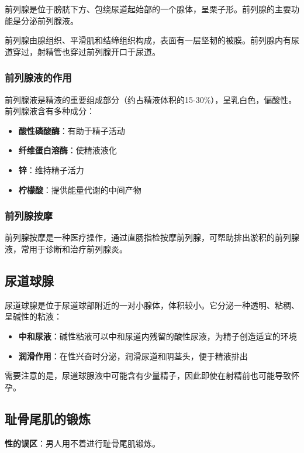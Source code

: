前列腺是位于膀胱下方、包绕尿道起始部的一个腺体，呈栗子形。前列腺的主要功能是分泌前列腺液。

前列腺由腺组织、平滑肌和结缔组织构成，表面有一层坚韧的被膜。前列腺内有尿道穿过，射精管也穿过前列腺开口于尿道。

\subsubsection{前列腺液的作用}

前列腺液是精液的重要组成部分（约占精液体积的15-30\%），呈乳白色，偏酸性。前列腺液含有多种成分：
\begin{itemize}
    \item \textbf{酸性磷酸酶}：有助于精子活动
    \item \textbf{纤维蛋白溶酶}：使精液液化
    \item \textbf{锌}：维持精子活力
    \item \textbf{柠檬酸}：提供能量代谢的中间产物
\end{itemize}

\subsubsection{前列腺按摩}

前列腺按摩是一种医疗操作，通过直肠指检按摩前列腺，可帮助排出淤积的前列腺液，常用于诊断和治疗前列腺炎。

\subsection{尿道球腺}

尿道球腺是位于尿道球部附近的一对小腺体，体积较小。它分泌一种透明、粘稠、呈碱性的粘液：
\begin{itemize}
    \item \textbf{中和尿液}：碱性粘液可以中和尿道内残留的酸性尿液，为精子创造适宜的环境
    \item \textbf{润滑作用}：在性兴奋时分泌，润滑尿道和阴茎头，便于精液排出
\end{itemize}

需要注意的是，尿道球腺液中可能含有少量精子，因此即使在射精前也可能导致怀孕。

\subsection{耻骨尾肌的锻炼}

\textbf{性的误区}：男人用不着进行耻骨尾肌锻炼。

